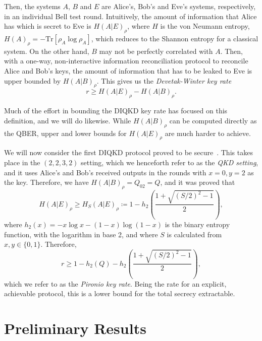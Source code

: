 \documentclass[10pt, a4paper]{article}
\newcommand{\?}{\mathrel{?}} %
\newcommand{\Tr}{\mathrm{Tr}} %
\numberwithin{equation}{section} %
\theoremstyle{definition}
\theoremstyle{plain}
\theoremstyle{plain}
\begin{document}
  Then, the systems \(A\), \(B\) and \(E\) are Alice's, Bob's and Eve's systems, respectively, in an individual Bell test round. Intuitively, the amount of information that Alice has which is secret to Eve is \({H(A|E)}_{\rho}\), where \(H\) is the von Neumann entropy, \({H(A)}_{\rho} = -\Tr\left[\rho_{A}\log\rho_{A}\right]\), which reduces to the Shannon entropy for a classical system. On the other hand, \(B\) may not be perfectly correlated with \(A\). Then, with a one-way, non-interactive information reconciliation protocol to reconcile Alice and Bob's keys, the amount of information that has to be leaked to Eve is upper bounded by \({H(A|B)}_{\rho}\). This gives us the \emph{Devetak-Winter key rate}~\cite{DevetakWinter}
  \begin{equation}
    r \geq {H(A|E)}_{\rho} - {H(A|B)}_{\rho}.
  \end{equation}

  Much of the effort in bounding the DIQKD key rate has focused on this definition, and we will do likewise. While \({H(A|B)}_{\rho}\) can be computed directly as the QBER, upper and lower bounds for \({H(A|E)}_{\rho}\) are much harder to achieve.

  We will now consider the first DIQKD protocol proved to be secure~\cite{DIQKD_Lower}. This takes place in the \((2,2,3,2)\) setting, which we henceforth refer to as the \emph{QKD setting}, and it uses Alice's and Bob's received outputs in the rounds with \(x = 0, y = 2\) as the key. Therefore, we have \({H(A|B)}_{\rho} = Q_{02} = Q\), and it was proved that
  \begin{equation}
    {H(A|E)}_{\rho} \geq {H_S(A|E)}_{\rho} \coloneqq 1 - h_2\left( \frac{1 + \sqrt{{(S/2)}^2-1}}{2} \right),
  \end{equation}
  where \(h_2(x) = - x \log x - (1-x) \log (1-x)\) is the binary entropy function, with the logarithm in base 2, and where \(S\) is calculated from \(x,y \in \{0,1\}\). Therefore,
  \begin{equation}
    r \geq 1 - h_2(Q) - h_2\left( \frac{1 + \sqrt{{(S/2)}^2-1}}{2} \right),
  \end{equation}
  which we refer to as the \emph{Pironio key rate}. Being the rate for an explicit, achievable protocol, this is a lower bound for the total secrecy extractable.

  \section{Preliminary Results}
\end{document}

